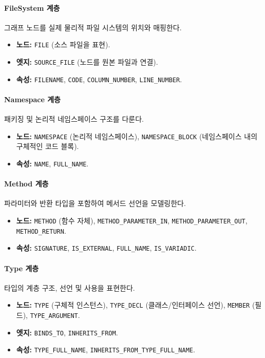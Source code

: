 \paragraph{FileSystem 계층} 그래프 노드를 실제 물리적 파일 시스템의 위치와 매핑한다.
\begin{itemize} \setlength{\itemsep}{0pt} \setlength{\parskip}{0pt} \setlength{\topsep}{0pt} \setlength{\partopsep}{0pt}
    \item \textbf{노드:} \texttt{FILE} (소스 파일을 표현).
    \item \textbf{엣지:} \texttt{SOURCE\_FILE} (노드를 원본 파일과 연결).
    \item \textbf{속성:} \texttt{FILENAME}, \texttt{CODE}, \texttt{COLUMN\_NUMBER}, \texttt{LINE\_NUMBER}.
\end{itemize}

\paragraph{Namespace 계층} 패키징 및 논리적 네임스페이스 구조를 다룬다.
\begin{itemize} \setlength{\itemsep}{0pt} \setlength{\parskip}{0pt} \setlength{\topsep}{0pt} \setlength{\partopsep}{0pt}
    \item \textbf{노드:} \texttt{NAMESPACE} (논리적 네임스페이스), \texttt{NAMESPACE\_BLOCK} (네임스페이스 내의 구체적인 코드 블록).
    \item \textbf{속성:} \texttt{NAME}, \texttt{FULL\_NAME}.
\end{itemize}

\paragraph{Method 계층} 파라미터와 반환 타입을 포함하여 메서드 선언을 모델링한다.
\begin{itemize} \setlength{\itemsep}{0pt} \setlength{\parskip}{0pt} \setlength{\topsep}{0pt} \setlength{\partopsep}{0pt}
    \item \textbf{노드:} \texttt{METHOD} (함수 자체), \texttt{METHOD\_PARAMETER\_IN}, \texttt{METHOD\_PARAMETER\_OUT}, \texttt{METHOD\_RETURN}.
    \item \textbf{속성:} \texttt{SIGNATURE}, \texttt{IS\_EXTERNAL}, \texttt{FULL\_NAME}, \texttt{IS\_VARIADIC}.
\end{itemize}

\paragraph{Type 계층} 타입의 계층 구조, 선언 및 사용을 표현한다.
\begin{itemize} \setlength{\itemsep}{0pt} \setlength{\parskip}{0pt} \setlength{\topsep}{0pt} \setlength{\partopsep}{0pt}
    \item \textbf{노드:} \texttt{TYPE} (구체적 인스턴스), \texttt{TYPE\_DECL} (클래스/인터페이스 선언), \texttt{MEMBER} (필드), \texttt{TYPE\_ARGUMENT}.
    \item \textbf{엣지:} \texttt{BINDS\_TO}, \texttt{INHERITS\_FROM}.
    \item \textbf{속성:} \texttt{TYPE\_FULL\_NAME}, \texttt{INHERITS\_FROM\_TYPE\_FULL\_NAME}.
\end{itemize}

